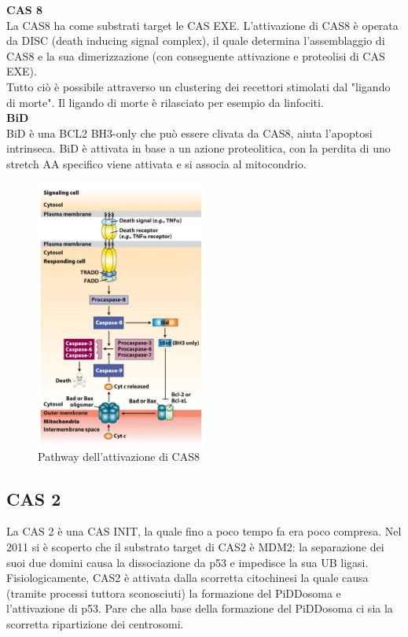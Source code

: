         \textbf{CAS 8}\\
            La CAS8 ha come substrati target le CAS EXE. L'attivazione di CAS8 è operata da DISC (death inducing signal complex), il quale determina l'assemblaggio di CAS8 e la sua dimerizzazione (con conseguente attivazione e proteolisi di CAS EXE). \\
            Tutto ciò è possibile attraverso un clustering dei recettori stimolati dal "ligando di morte". Il ligando di morte è rilasciato per esempio da linfociti.\\
            
        \textbf{BiD}\\
            BiD è una BCL2 BH3-only che può essere clivata da CAS8, aiuta l'apoptosi intrinseca. BiD è attivata in base a un azione proteolitica, con la perdita di uno stretch AA specifico viene attivata e si associa al mitocondrio.
            
        \begin{figure}[h]
           \centering \includegraphics[width=0.5\textwidth]{images/CAS8.JPG}
           \caption{\small Pathway dell'attivazione di CAS8}            
            \label{fig:mesh1}
        \end{figure} 
        
    \subsection{CAS 2}
        La CAS 2 è una CAS INIT, la quale fino a poco tempo fa era poco compresa. Nel 2011 si è scoperto che il substrato target di CAS2 è MDM2: la separazione dei suoi due domini causa la dissociazione da p53 e impedisce la sua UB ligasi.\\
        Fisiologicamente, CAS2 è attivata dalla scorretta citochinesi la quale causa (tramite processi tuttora sconosciuti) la formazione del PiDDosoma e l'attivazione di p53. Pare che alla base della formazione del PiDDosoma ci sia la scorretta ripartizione dei centrosomi. 

\pagebreak